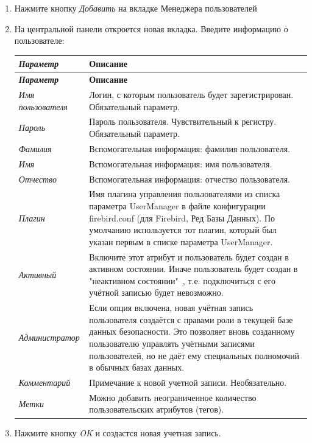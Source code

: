 
\begin{enumerate}[leftmargin=39pt]
	\item Нажмите кнопку \textit{Добавить} на вкладке Менеджера пользователей
	\item На центральной панели откроется новая вкладка. Введите информацию о пользователе:
	\label{tab:adduser}
	\begin{longtable}[r]{|>{\itshape}m{3.2cm}|m{11cm}|}
		\hline
		\centering\normalfont\bfseries Параметр &
		\centering\arraybslash\bfseries Описание\\\hline
		\endfirsthead
		\hline
		\centering\normalfont\bfseries Параметр &
		\centering\arraybslash\bfseries Описание\\\hline
		\endhead
		Имя пользователя & Логин, с которым пользователь будет зарегистрирован. Обязательный параметр. \\\hline
		Пароль & Пароль пользователя. Чувствительный к регистру. Обязательный параметр. \\\hline
		Фамилия & Вспомогательная информация: фамилия пользователя.\\\hline
		Имя & Вспомогательная информация: имя пользователя. \\\hline
		Отчество & Вспомогательная информация: отчество пользователя. \\\hline
		Плагин & Имя плагина управления пользователями из списка параметра UserManager в файле конфигурации firebird.conf (для Firebird, Ред Базы Данных). По умолчанию используется тот плагин, который был указан первым в списке параметра UserManager. \\\hline
		Активный & Включите этот атрибут и пользователь будет создан в активном состоянии. Иначе пользователь будет	создан в "неактивном состоянии"\ , т.е. подключиться с его учётной записью будет невозможно.\\\hline
		Администратор & Если опция включена, новая учётная запись пользователя создаётся с правами роли \ttt{RDB\$ADMIN} в текущей базе данных безопасности. Это позволяет вновь созданному пользователю управлять учётными записями пользователей, но не даёт ему специальных полномочий в обычных базах данных.\\\hline
		Комментарий & Примечание к новой учетной записи. Необязательно.\\\hline
		Метки & Можно добавить неограниченное количество пользовательских атрибутов (тегов). \\\hline
	\end{longtable} 	
	\item Нажмите кнопку \textit{OK} и создастся новая учетная запись.
\end{enumerate}	


